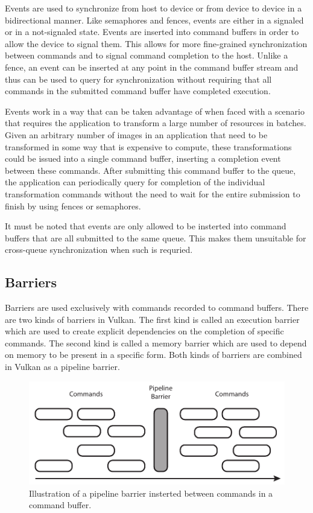       Events are used to synchronize from \gls{host} to device or from device to device in a bidirectional manner.
      Like semaphores and fences, events are either in a signaled or in a not-signaled state.
      Events are inserted into command buffers in order to allow the device to signal them.
      This allows for more fine-grained synchronization between commands and to signal command completion to the \gls{host}.
      Unlike a fence, an event can be inserted at any point in the command buffer stream and thus can be used to query for synchronization without requiring that all commands in the submitted command buffer have completed execution.

      Events work in a way that can be taken advantage of when faced with a scenario that requires the \gls{application} to transform a large number of resources in batches.
      Given an arbitrary number of images in an \gls{application} that need to be transformed in some way that is expensive to compute, these transformations could be issued into a single command buffer, inserting a completion event between these commands.
      After submitting this command buffer to the queue, the \gls{application} can periodically query for completion of the individual transformation commands without the need to wait for the entire submission to finish by using fences or semaphores.

      It must be noted that events are only allowed to be insterted into command buffers that are all submitted to the same queue.
      This makes them unsuitable for cross-queue synchronization when such is requried.

    \subsection{Barriers}
    \label{sub:Barriers}
      Barriers are used exclusively with commands recorded to command buffers.
      There are two kinds of barriers in Vulkan.
      The first kind is called an execution barrier which are used to create explicit dependencies on the completion of specific commands.
      The second kind is called a memory barrier which are used to depend on memory to be present in a specific form.
      Both kinds of barriers are combined in Vulkan as a pipeline barrier.

      \begin{figure}
        \centering
        \includegraphics[width=\textwidth]{Main/Images/PipelineBarrier}
        \caption{Illustration of a pipeline barrier insterted between commands in a command buffer.}
        \label{fig:PipelineBarrier}
      \end{figure}

